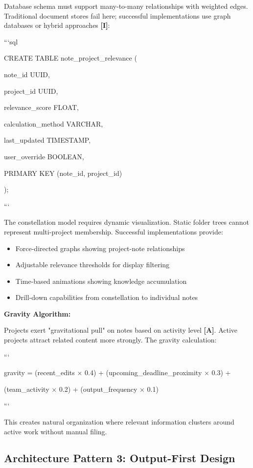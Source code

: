 \documentclass[a4paper,11pt]{article}
\newcommand{\ilabel}{\textbf{\textcolor{icolor}{[I]}}}
\newcommand{\alabel}{\textbf{\textcolor{acolor}{[A]}}}
\begin{document}
Database schema must support many-to-many relationships with weighted edges. Traditional document stores fail here; successful implementations use graph databases or hybrid approaches \ilabel{}:


```sql

CREATE TABLE note\_project\_relevance (

note\_id UUID,

project\_id UUID,

relevance\_score FLOAT,

calculation\_method VARCHAR,

last\_updated TIMESTAMP,

user\_override BOOLEAN,

PRIMARY KEY (note\_id, project\_id)

);

```


The constellation model requires dynamic visualization. Static folder trees cannot represent multi-project membership. Successful implementations provide:

\begin{itemize}
  \item Force-directed graphs showing project-note relationships
  \item Adjustable relevance thresholds for display filtering
  \item Time-based animations showing knowledge accumulation
  \item Drill-down capabilities from constellation to individual notes
\end{itemize}

\textbf{Gravity Algorithm:}\par

Projects exert "gravitational pull" on notes based on activity level \alabel{}. Active projects attract related content more strongly. The gravity calculation:


```

gravity = (recent\_edits × 0.4) + (upcoming\_deadline\_proximity × 0.3) +

(team\_activity × 0.2) + (output\_frequency × 0.1)

```


This creates natural organization where relevant information clusters around active work without manual filing.


\subsection{Architecture Pattern 3: Output-First Design}
\end{document}
